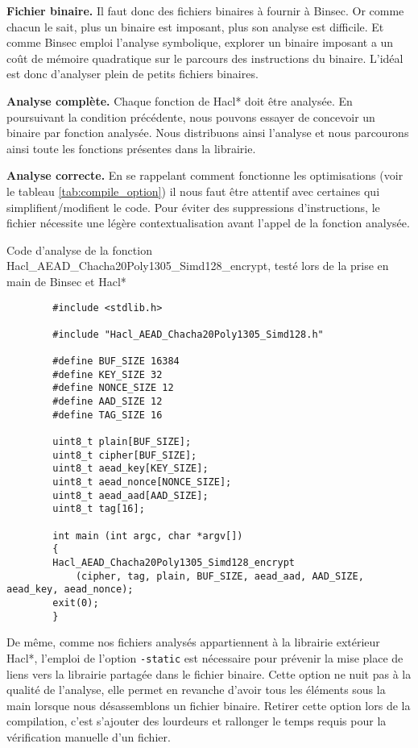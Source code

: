 \textbf{Fichier binaire.} Il faut donc des fichiers binaires à fournir à Binsec. Or comme chacun le sait, plus un binaire est imposant, plus son analyse est difficile. Et comme Binsec emploi l'analyse symbolique, explorer un binaire imposant a un coût de mémoire quadratique sur le parcours des instructions du binaire. L'idéal est donc d'analyser plein de petits fichiers binaires.\smallbreak

\textbf{Analyse complète.} Chaque fonction de Hacl* doit être analysée. En poursuivant la condition précédente, nous pouvons essayer de concevoir un binaire par fonction analysée. Nous distribuons ainsi l'analyse et nous parcourons ainsi toute les fonctions présentes dans la librairie.\medbreak

\textbf{Analyse correcte.} En se rappelant comment fonctionne les optimisations (voir le tableau \ref{tab:compile_option}) il nous faut être attentif avec certaines qui simplifient/modifient le code. Pour éviter des suppressions d'instructions, le fichier nécessite une légère contextualisation avant l'appel de la fonction analysée.

\begin{listing}[!ht]
    \caption{Code d'analyse de la fonction Hacl\_AEAD\_Chacha20Poly1305\_Simd128\_encrypt, testé lors de la prise en main de Binsec et Hacl*}
    \label{lst:prise_en_main}
    \begin{verbatim}
        #include <stdlib.h>

        #include "Hacl_AEAD_Chacha20Poly1305_Simd128.h"

        #define BUF_SIZE 16384
        #define KEY_SIZE 32
        #define NONCE_SIZE 12
        #define AAD_SIZE 12
        #define TAG_SIZE 16

        uint8_t plain[BUF_SIZE];
        uint8_t cipher[BUF_SIZE];
        uint8_t aead_key[KEY_SIZE];
        uint8_t aead_nonce[NONCE_SIZE];
        uint8_t aead_aad[AAD_SIZE];
        uint8_t tag[16];

        int main (int argc, char *argv[])
        {
        Hacl_AEAD_Chacha20Poly1305_Simd128_encrypt
            (cipher, tag, plain, BUF_SIZE, aead_aad, AAD_SIZE, aead_key, aead_nonce);
        exit(0);
        }
    \end{verbatim}
\end{listing}

De même, comme nos fichiers analysés appartiennent à la librairie extérieur Hacl*, l'emploi de l'option \texttt{-static} est nécessaire pour prévenir la mise place de liens vers la librairie partagée dans le fichier binaire. Cette option ne nuit pas à la qualité de l'analyse, elle permet en revanche d'avoir tous les éléments sous la main lorsque nous désassemblons un fichier binaire. Retirer cette option lors de la compilation, c'est s'ajouter des lourdeurs et rallonger le temps requis pour la vérification manuelle d'un fichier.\medbreak

